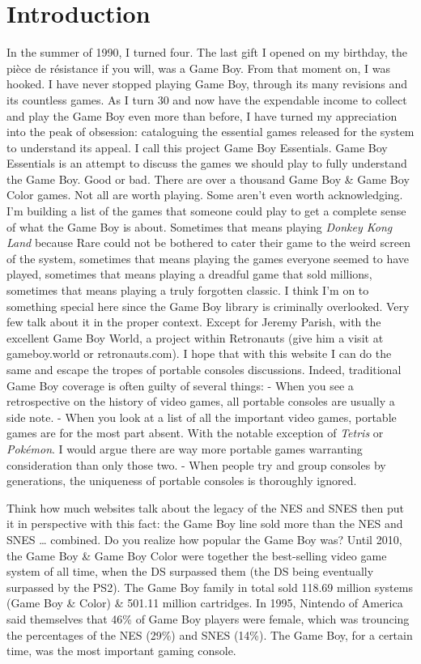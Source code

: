 \documentclass{book}
\begin{document}
\chapter*{Introduction}
In the summer of 1990, I turned four. The last gift I opened on my birthday, the pièce de résistance if you will, was a Game Boy. From that moment on, I was hooked. I have never stopped playing Game Boy, through its many revisions and its countless games. As I turn 30 and now have the expendable income to collect and play the Game Boy even more than before, I have turned my appreciation into the peak of obsession: cataloguing the essential games released for the system to understand its appeal. I call this project Game Boy Essentials.
Game Boy Essentials is an attempt to discuss the games we should play to fully understand the Game Boy. Good or bad.
There are over a thousand Game Boy \& Game Boy Color games. Not all are worth playing. Some aren’t even worth acknowledging. I’m building a list of the games that someone could play to get a complete sense of what the Game Boy is about. Sometimes that means playing \emph{Donkey Kong Land} because Rare could not be bothered to cater their game to the weird screen of the system, sometimes that means playing the games everyone seemed to have played, sometimes that means playing a dreadful game that sold millions, sometimes that means playing a truly forgotten classic.
I think I’m on to something special here since the Game Boy library is criminally overlooked. Very few talk about it in the proper context. Except for Jeremy Parish, with the excellent Game Boy World, a project within Retronauts (give him a visit at gameboy.world or retronauts.com). I hope that with this website I can do the same and escape the tropes of portable consoles discussions. Indeed, traditional Game Boy coverage is often guilty of several things:
- When you see a retrospective on the history of video games, all portable consoles are usually a side note.
- When you look at a list of all the important video games, portable games are for the most part absent. With the notable exception of \emph{Tetris} or \emph{Pokémon}. I would argue there are way more portable games warranting consideration than only those two.
- When people try and group consoles by generations, the uniqueness of portable consoles is thoroughly ignored.\par
Think how much websites talk about the legacy of the NES and SNES then put it in perspective with this fact: the Game Boy line sold more than the NES and SNES … combined. Do you realize how popular the Game Boy was? Until 2010, the Game Boy \& Game Boy Color were together the best-selling video game system of all time, when the DS surpassed them (the DS being eventually surpassed by the PS2). The Game Boy family in total sold 118.69 million systems (Game Boy \& Color) \& 501.11 million cartridges. In 1995, Nintendo of America said themselves that 46\% of Game Boy players were female, which was trouncing the percentages of the NES (29\%) and SNES (14\%). The Game Boy, for a certain time, was the most important gaming console.
\end{document}
